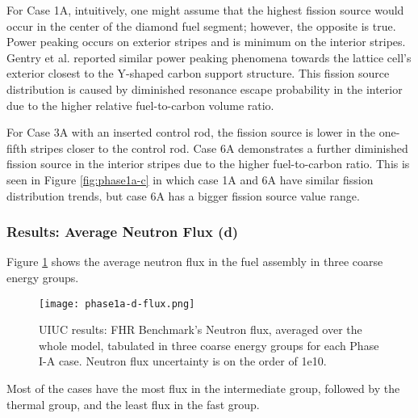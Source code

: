 For Case 1A, intuitively, one might assume that the highest fission source would 
occur in the center of the diamond fuel segment; however, the opposite is true. 
Power peaking occurs on exterior stripes and is minimum on the interior stripes.
Gentry et al. \cite{gentry_development_2016} reported similar power peaking 
phenomena towards the lattice cell's exterior closest to the Y-shaped carbon 
support structure.  
This fission source distribution is caused by diminished resonance escape 
probability in the interior due to the higher relative fuel-to-carbon volume 
ratio. 

For Case 3A with an inserted control rod, the fission source is lower in 
the one-fifth stripes closer to the control rod.  
Case 6A demonstrates a further diminished fission source in the interior 
stripes due to the higher fuel-to-carbon ratio.
This is seen in Figure \ref{fig:phase1a-c} in which case 1A and 6A have similar 
fission distribution trends, but case 6A has a bigger fission source value range. 

\subsubsection{Results: Average Neutron Flux (d)}
Figure \ref{fig:phase1a-d} shows the average neutron flux in the fuel assembly in 
three coarse energy groups. 
\begin{figure}[htbp]
    \centering
    \texttt{[image: phase1a-d-flux.png]} 
    \caption{\acrlong{UIUC} results: \acrlong{FHR} Benchmark's Neutron flux, 
    averaged over the whole model, tabulated in three coarse energy groups for 
    each Phase I-A case. Neutron flux uncertainty is on the order of 1e10.}
    \label{fig:phase1a-d}
\end{figure}
Most of the cases have the most flux in the intermediate group, followed by 
the thermal group, and the least flux in the fast group.   

